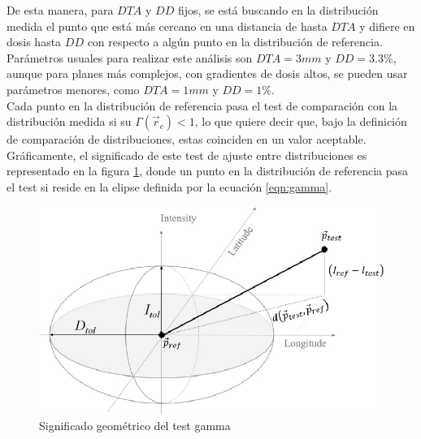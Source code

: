 De esta manera, para $DTA$ y $DD$ fijos, se está buscando en la distribución medida el punto que está más cercano en una distancia de hasta $DTA$ y difiere en dosis hasta $DD$ con respecto a algún punto en la distribución de referencia. Parámetros usuales para realizar este análisis son $DTA=3 mm$ y $DD=3.3\%$, aunque para planes más complejos, con gradientes de dosis altos, se pueden usar parámetros menores, como $DTA=1 mm$ y $DD=1\%$.\\

Cada punto en la distribución de referencia pasa el test de comparación con la distribución medida si su $\Gamma(\vec{r}_c)<1$, lo que quiere decir que, bajo la definición de comparación de distribuciones, estas coinciden en un valor aceptable. Gráficamente, el significado de este test de ajuste entre distribuciones es representado en la figura \ref{fig:elipseGamma}, donde un punto en la distribución de referencia pasa el test si reside en la elipse  definida por la ecuación \eqref{eqn:gamma}.\\
\begin{figure}
	\centering
	\includegraphics[width=0.5\linewidth]{images/gammaEllipse.png}
	\caption{Significado geométrico del test gamma }
	\label{fig:elipseGamma}
\end{figure}





